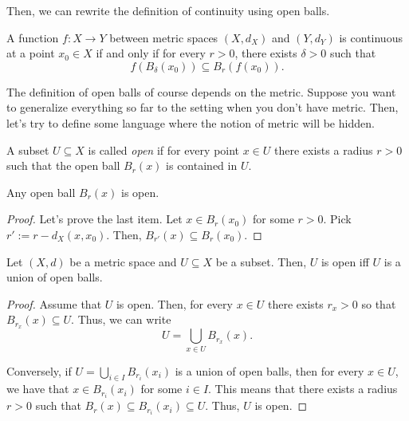 Then, we can rewrite the definition of continuity using open balls.

\begin{proposition}
  A function $f:X\to Y$ between metric spaces $(X,d_X)$ and $(Y,d_Y)$ is continuous at a point $x_0\in X$ if and only if for every $r>0$, there exists $\delta>0$ such that
  \[
  f(B_\delta(x_0))\subseteq B_r(f(x_0)).
  \]
\end{proposition}

The definition of open balls of course depends on the metric. Suppose you want to generalize everything so far to the setting when you don't have metric. Then, let's try to define some language where the notion of metric will be hidden. 

\begin{definition}
      A subset $U\subseteq X$ is called \emph{open} if for every point $x\in U$ there exists a radius $r>0$ such that the open ball $B_r(x)$ is contained in $U$.
\end{definition}

\begin{proposition}
  Any open ball $B_r(x)$ is open.
\end{proposition}
\begin{proof}
  Let's prove the last item. Let $x\in B_r(x_0)$ for some $r>0$. Pick $r':=r-d_X(x,x_0)$. Then, $B_{r'}(x)\subseteq B_r(x_0)$.
\end{proof}

\begin{corollary}
  Let $(X,d)$ be a metric space and $U\subseteq X$ be a subset. Then, $U$ is open iff $U$ is a union of open balls.
\end{corollary}

\begin{proof}
  Assume that $U$ is open. Then, for every $x\in U$ there exists $r_x>0$ so that $B_{r_x}(x)\subseteq U$. Thus, we can write
  \[
  U = \bigcup_{x\in U} B_{r_x}(x).
  \]

  Conversely, if $U=\bigcup_{i\in I}B_{r_i}(x_i)$ is a union of open balls, then for every $x\in U$, we have that $x\in B_{r_i}(x_i)$ for some $i\in I$. This means that there exists a radius $r>0$ such that $B_r(x)\subseteq B_{r_i}(x_i)\subseteq U$. Thus, $U$ is open.
\end{proof}


